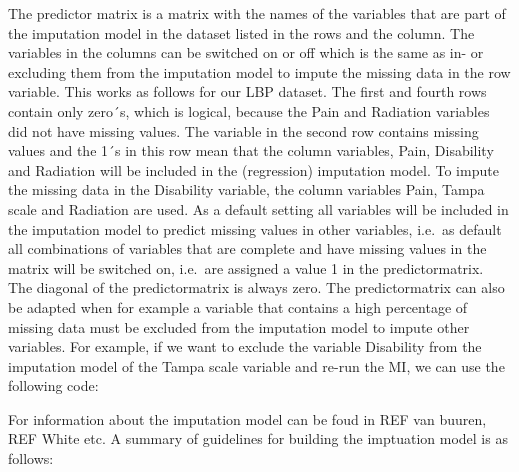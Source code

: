 \documentclass[]{book}
\newenvironment{Shaded}{\begin{snugshade}}{\end{snugshade}}
\newcommand{\KeywordTok}[1]{\textcolor[rgb]{0.13,0.29,0.53}{\textbf{#1}}}
\newcommand{\DataTypeTok}[1]{\textcolor[rgb]{0.13,0.29,0.53}{#1}}
\newcommand{\DecValTok}[1]{\textcolor[rgb]{0.00,0.00,0.81}{#1}}
\newcommand{\StringTok}[1]{\textcolor[rgb]{0.31,0.60,0.02}{#1}}
\newcommand{\OperatorTok}[1]{\textcolor[rgb]{0.81,0.36,0.00}{\textbf{#1}}}
\newcommand{\NormalTok}[1]{#1}
\begin{document}
The predictor matrix is a matrix with the names of the variables that
are part of the imputation model in the dataset listed in the rows and
the column. The variables in the columns can be switched on or off which
is the same as in- or excluding them from the imputation model to impute
the missing data in the row variable. This works as follows for our LBP
dataset. The first and fourth rows contain only zero´s, which is
logical, because the Pain and Radiation variables did not have missing
values. The variable in the second row contains missing values and the
1´s in this row mean that the column variables, Pain, Disability and
Radiation will be included in the (regression) imputation model. To
impute the missing data in the Disability variable, the column variables
Pain, Tampa scale and Radiation are used. As a default setting all
variables will be included in the imputation model to predict missing
values in other variables, i.e.~as default all combinations of variables
that are complete and have missing values in the matrix will be switched
on, i.e.~are assigned a value 1 in the predictormatrix. The diagonal of
the predictormatrix is always zero. The predictormatrix can also be
adapted when for example a variable that contains a high percentage of
missing data must be excluded from the imputation model to impute other
variables. For example, if we want to exclude the variable Disability
from the imputation model of the Tampa scale variable and re-run the MI,
we can use the following code:

\begin{Shaded}
\end{Shaded}

For information about the imputation model can be foud in REF van
buuren, REF White etc. A summary of guidelines for building the
imptuation model is as follows:
\end{document}
